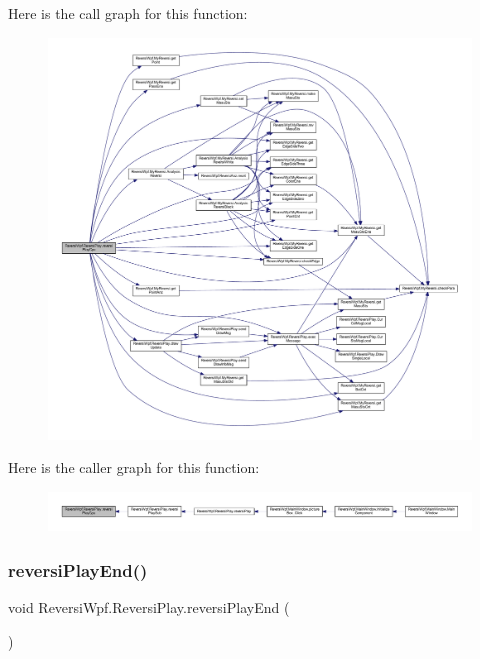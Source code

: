 Here is the call graph for this function\+:
\nopagebreak
\begin{figure}[H]
\begin{center}
\leavevmode
\includegraphics[width=350pt]{class_reversi_wpf_1_1_reversi_play_ab9824cdb1bc61ac894ea237b732bd166_cgraph}
\end{center}
\end{figure}
Here is the caller graph for this function\+:
\nopagebreak
\begin{figure}[H]
\begin{center}
\leavevmode
\includegraphics[width=350pt]{class_reversi_wpf_1_1_reversi_play_ab9824cdb1bc61ac894ea237b732bd166_icgraph}
\end{center}
\end{figure}
\mbox{\label{class_reversi_wpf_1_1_reversi_play_a091d27bec4b3570ab595a49170342105}} 
\subsubsection{\texorpdfstring{reversi\+Play\+End()}{reversiPlayEnd()}}
{\footnotesize\ttfamily void Reversi\+Wpf.\+Reversi\+Play.\+reversi\+Play\+End (\begin{DoxyParamCaption}{ }\end{DoxyParamCaption})}



